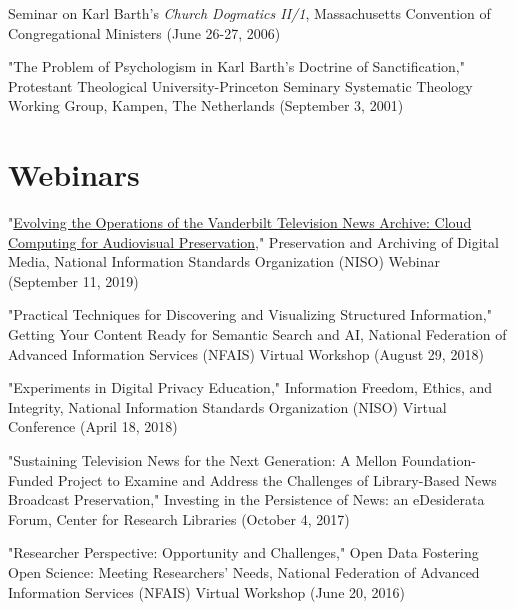 \documentclass[10pt]{res} %
\begin{document}
\begin{resume}
\begin{hangparas}{.25in}{1}Seminar on Karl Barth’s \textit{Church Dogmatics II/1}, Massachusetts Convention of Congregational Ministers (June 26-27, 2006)\end{hangparas}

\begin{hangparas}{.25in}{1}"The Problem of Psychologism in Karl Barth’s Doctrine of Sanctification," Protestant Theological University-Princeton Seminary Systematic Theology Working Group, Kampen, The Netherlands (September 3, 2001)\end{hangparas}

\section{Webinars}

\begin{hangparas}{.25in}{1}"\href{https://www.niso.org/events/2019/09/preservation-and-archiving-digital-media}{Evolving the Operations of the Vanderbilt Television News Archive: Cloud Computing for Audiovisual Preservation}," Preservation and Archiving of Digital Media, National Information Standards Organization (NISO) Webinar (September 11, 2019)\end{hangparas}

\begin{hangparas}{.25in}{1}"Practical Techniques for Discovering and Visualizing Structured Information," Getting Your Content Ready for Semantic Search and AI, National Federation of Advanced Information Services (NFAIS) Virtual Workshop (August 29, 2018)\end{hangparas}

\begin{hangparas}{.25in}{1}"Experiments in Digital Privacy Education," Information Freedom, Ethics, and Integrity, National Information Standards Organization (NISO) Virtual Conference (April 18, 2018)\end{hangparas}

\begin{hangparas}{.25in}{1}"Sustaining Television News for the Next Generation: A Mellon Foundation-Funded Project to Examine and Address the Challenges of Library-Based News Broadcast Preservation," Investing in the Persistence of News: an eDesiderata Forum, Center for Research Libraries (October 4, 2017)\end{hangparas}

\begin{hangparas}{.25in}{1}"Researcher Perspective: Opportunity and Challenges," Open Data Fostering Open Science: Meeting Researchers’ Needs, National Federation of Advanced Information Services (NFAIS) Virtual Workshop (June 20, 2016)\end{hangparas}


\end{resume}
\end{document}
